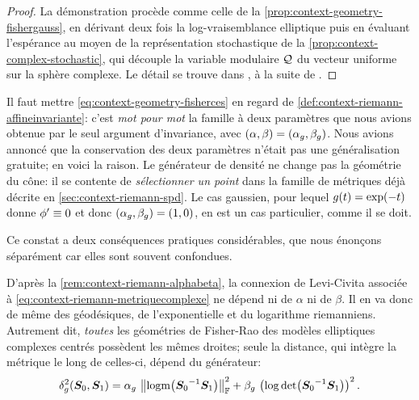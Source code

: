 \begin{proof}
  La démonstration procède comme celle de la \cref{prop:context-geometry-fishergauss}, en dérivant deux fois la log-vraisemblance elliptique puis en évaluant l'espérance au moyen de la représentation stochastique de la \cref{prop:context-complex-stochastic}, qui découple la variable modulaire $\mathcal{Q}$ du vecteur uniforme sur la sphère complexe. Le détail se trouve dans , à la suite de .
\end{proof}

\begin{remark}
\label{rem:context-geometry-boucle}
  Il faut mettre \cref{eq:context-geometry-fisherces} en regard de \cref{def:context-riemann-affineinvariante}: c'est \emph{mot pour mot} la famille à deux paramètres que nous avions obtenue par le seul argument d'invariance, avec $(\alpha,\beta)=(\alpha_g,\beta_g)$. Nous avions annoncé que la conservation des deux paramètres n'était pas une généralisation gratuite; en voici la raison. Le générateur de densité ne change pas la géométrie du cône: il se contente de \emph{sélectionner un point} dans la famille de métriques déjà décrite en \cref{sec:context-riemann-spd}. Le cas gaussien, pour lequel $g(t)=\exp(-t)$ donne $\phi'\equiv 0$ et donc $(\alpha_g,\beta_g)=(1,0)$, en est un cas particulier, comme il se doit.
\end{remark}

Ce constat a deux conséquences pratiques considérables, que nous énonçons séparément car elles sont souvent confondues.

\begin{property}
\label{prop:context-geometry-memesgeodesiques}
  D'après la \cref{rem:context-riemann-alphabeta}, la connexion de Levi-Civita associée à \cref{eq:context-riemann-metriquecomplexe} ne dépend ni de $\alpha$ ni de $\beta$. Il en va donc de même des géodésiques, de l'exponentielle et du logarithme riemanniens. Autrement dit, \emph{toutes} les géométries de Fisher-Rao des modèles elliptiques complexes centrés possèdent les mêmes droites; seule la distance, qui intègre la métrique le long de celles-ci, dépend du générateur:
  \begin{equation}
    \delta^2_g(\boldsymbol{S}_0,\boldsymbol{S}_1)
    =
    \alpha_g\,\left\lVert\operatorname{\operatorname{logm}}\!\left({\boldsymbol{S}_0}^{-1}\boldsymbol{S}_1\right)\right\rVert_{\mathbb{F}}^2
    +
    \beta_g\,\left(\log\operatorname{\operatorname{det}}\!\left({\boldsymbol{S}_0}^{-1}\boldsymbol{S}_1\right)\right)^2.
    \label{eq:context-geometry-distces}
  \end{equation}
\end{property}

